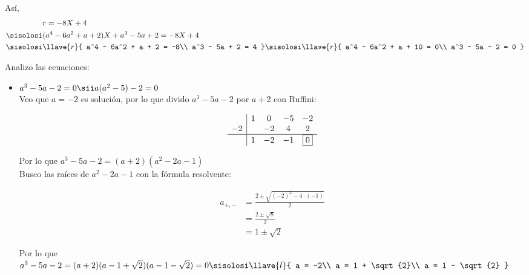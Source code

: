 \begin{enumerate}[label=\roman*)]
        Así,
        \begin{align*}
            & r = -8X + 4\\
            \sisolosi & (a^4 - 6a^2 + a + 2)X + a^3 - 5a + 2 = -8X + 4\\
            \sisolosi & \llave{r}{
                a^4 - 6a^2 + a + 2 = -8\\
                a^3 - 5a + 2 = 4
            }
            \sisolosi \llave{r}{
                a^4 - 6a^2 + a + 10 = 0\\
                a^3 - 5a - 2 = 0
            }
        \end{align*}

        Analizo las ecuaciones:\\
        
        \begin{itemize}
            \item $a^3 - 5a - 2 = 0 \sii a(a^2 - 5) - 2 = 0$\\
            Veo que $a = -2$ es solución, por lo que divido $a^3 - 5a - 2$ por $a + 2$ con Ruffini:
        
            \[
                \begin{array}{c|cccc}
                    & 1 & 0 & -5 & -2\\
                    -2 &  & -2 & 4 & 2\\
                    \hline
                    & 1 & -2 & -1 & \boxed{0}
                \end{array}
            \]

            Por lo que $a^3 - 5a - 2 = (a + 2)(a^2 - 2a - 1)$\\

            Busco las raíces de $a^2 - 2a - 1$ con la fórmula resolvente:

            \begin{align*}
                a_{+,-} &= \frac{2 \pm \sqrt{(-2)^2 - 4 \cdot (-1)}}{2}\\
                &= \frac{2 \pm \sqrt{8}}{2}\\
                &= 1 \pm \sqrt{2}
            \end{align*}

            Por lo que $a^3 - 5a - 2 = (a + 2)(a - 1 + \sqrt{2})(a - 1 - \sqrt{2}) = 0 \sisolosi \llave{l}{
                a = -2\\
                a = 1 + \sqrt{2}\\
                a = 1 - \sqrt{2}
            }$\\


\end{itemize}
\end{enumerate}
